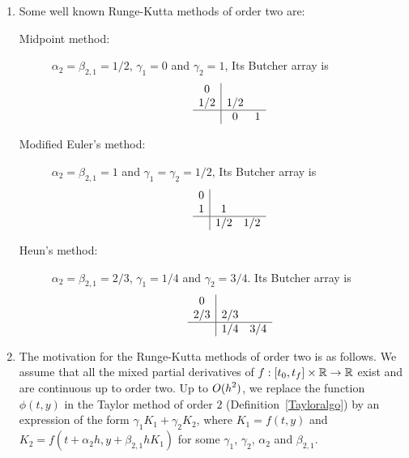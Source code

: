 \begin{rmkList}
\begin{enumerate}
\item Some well known Runge-Kutta methods of order two are:
\begin{description}
\item[Midpoint method:] $\alpha_2 = \beta_{2,1} = 1/2$, $\gamma_1=0$
and $\gamma_2=1$, 
Its Butcher array is
\[
\begin{array}{c|cc}
0 & & \\
1/2 & 1/2 & \\
\hline
 & 0 & 1
\end{array}
\]
\item[Modified Euler's method:] $\alpha_2 = \beta_{2,1} = 1$ and
$\gamma_1=\gamma_2=1/2$,
Its Butcher array is
\[
\begin{array}{c|cc}
0 & & \\
1 & 1 & \\
\hline
 & 1/2 & 1/2
\end{array}
\]
\item[Heun's method:] $\alpha_2 = \beta_{2,1}=2/3$, $\gamma_1=1/4$ and
$\gamma_2=3/4$.
Its Butcher array is
\[
\begin{array}{c|cc}
0 & & \\
2/3 & 2/3 & \\
\hline
 & 1/4 & 3/4
\end{array}
\]
\end{description}
\item The motivation for the Runge-Kutta methods of order two is as
follows.  We assume that all the mixed partial derivatives of
$f:[t_0,t_f]\times \mathbb{R} \rightarrow \mathbb{R}$ exist and are continuous up to
order two.  Up to $\displaystyle O(h^2)$, we replace the function
$\phi(t,y)$ in the
Taylor method of order $2$ (Definition~\ref{Tayloralgo}) by an
expression of the form $\gamma_1 K_1 + \gamma_2 K_2$, where
$K_1 = f(t,y)$ and $K_2=f(t+\alpha_2 h,y+\beta_{2,1} h K_1)$ for some
$\gamma_1$, $\gamma_2$, $\alpha_2$ and $\beta_{2,1}$.


\end{enumerate}
\end{rmkList}
